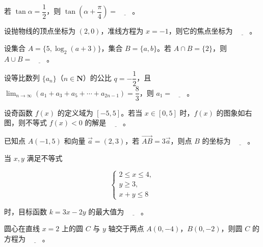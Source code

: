 \begin{question}
若 $\tan\alpha = \dfrac{1}{2}$，则 $\tan\left(\alpha + \dfrac{\pi}{4}\right) = \underline{\qquad}$。

\end{question}
\begin{question}
设抛物线的顶点坐标为 $(2, 0)$，准线方程为 $x = -1$，则它的焦点坐标为 $\underline{\qquad}$。

\end{question}
\begin{question}
设集合 $A = \{5, \log_2(a + 3)\}$，集合 $B = \{a, b\}$。若 $A \cap B = \{2\}$，则 $A \cup B = \underline{\qquad}$。

\end{question}
\begin{question}
设等比数列 $\{a_n\}$（$n \in \mathbf{N}$）的公比 $q = -\dfrac{1}{2}$，且 $\displaystyle\lim_{n\to\infty}(a_1 + a_3 + a_5 + \cdots + a_{2n-1}) = \dfrac{8}{3}$，则 $a_1 = \underline{\qquad}$。

\Needspace{0.4\textheight}
\end{question}
\begin{question}
设奇函数 $f(x)$ 的定义域为 $[-5, 5]$。若当 $x \in [0, 5]$ 时，$f(x)$ 的图象如右图，则不等式 $f(x) < 0$ 的解是 $\underline{\qquad}$。
\nopagebreak[4]
\begin{center}\end{center}
\nopagebreak[4]
\end{question}
\begin{question}
已知点 $A(-1, 5)$ 和向量 $\vec{a} = (2, 3)$，若 $\overrightarrow{AB} = 3\vec{a}$，则点 $B$ 的坐标为 $\underline{\qquad}$。

\end{question}
\begin{question}
当 $x, y$ 满足不等式

\nopagebreak[4]
\[
\begin{cases}
2 \leqslant x \leqslant 4,\\
y \geqslant 3,\\
x + y \leqslant 8
\end{cases}
\]

时，目标函数 $k = 3x - 2y$ 的最大值为 $\underline{\qquad}$。

\end{question}
\begin{question}
圆心在直线 $x = 2$ 上的圆 $C$ 与 $y$ 轴交于两点 $A(0, -4)$，$B(0, -2)$，则圆 $C$ 的方程为 $\underline{\qquad}$。

\end{question}
